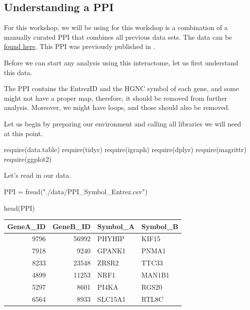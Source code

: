 \documentclass[
]{book}
\newenvironment{Shaded}{\begin{snugshade}}{\end{snugshade}}
\newcommand{\FunctionTok}[1]{\textcolor[rgb]{0.00,0.00,0.00}{#1}}
\newcommand{\NormalTok}[1]{#1}
\newcommand{\OtherTok}[1]{\textcolor[rgb]{0.56,0.35,0.01}{#1}}
\newcommand{\StringTok}[1]{\textcolor[rgb]{0.31,0.60,0.02}{#1}}
\begin{document}
\hypertarget{understanding-a-ppi}{%
\subsection{Understanding a PPI}\label{understanding-a-ppi}}

For this workshop, we will be using for this workshop is a combination of a manually curated PPI that combines all previous data sets. The data can be \href{https://github.com/deisygysi/NetMed_Workshop/blob/master/data/PPI_Symbol_Entrez.csv}{found here}. This PPI was previously published in \citet{Gysi2020a}.

Before we can start any analysis using this interactome, let us first understand this data.

The PPI contains the EntrezID and the HGNC symbol of each gene, and some might not have a proper map, therefore, it should be removed from further analysis. Moreover, we might have loops, and those should also be removed.

Let us begin by preparing our environment and calling all libraries we will need at this point.

\begin{Shaded}
\begin{Highlighting}[]
\FunctionTok{require}\NormalTok{(data.table)}
\FunctionTok{require}\NormalTok{(tidyr)}
\FunctionTok{require}\NormalTok{(igraph)}
\FunctionTok{require}\NormalTok{(dplyr)}
\FunctionTok{require}\NormalTok{(magrittr)}
\FunctionTok{require}\NormalTok{(ggplot2)}
\end{Highlighting}
\end{Shaded}

Let's read in our data.

\begin{Shaded}
\begin{Highlighting}[]
\NormalTok{PPI }\OtherTok{=} \FunctionTok{fread}\NormalTok{(}\StringTok{"./data/PPI\_Symbol\_Entrez.csv"}\NormalTok{)}
\end{Highlighting}
\end{Shaded}

\begin{Shaded}
\begin{Highlighting}[]
\FunctionTok{head}\NormalTok{(PPI)}
\end{Highlighting}
\end{Shaded}

\begin{tabular}{r|r|l|l}
\hline
GeneA\_ID & GeneB\_ID & Symbol\_A & Symbol\_B\\
\hline
9796 & 56992 & PHYHIP & KIF15\\
\hline
7918 & 9240 & GPANK1 & PNMA1\\
\hline
8233 & 23548 & ZRSR2 & TTC33\\
\hline
4899 & 11253 & NRF1 & MAN1B1\\
\hline
5297 & 8601 & PI4KA & RGS20\\
\hline
6564 & 8933 & SLC15A1 & RTL8C\\
\hline
\end{tabular}
\end{document}
